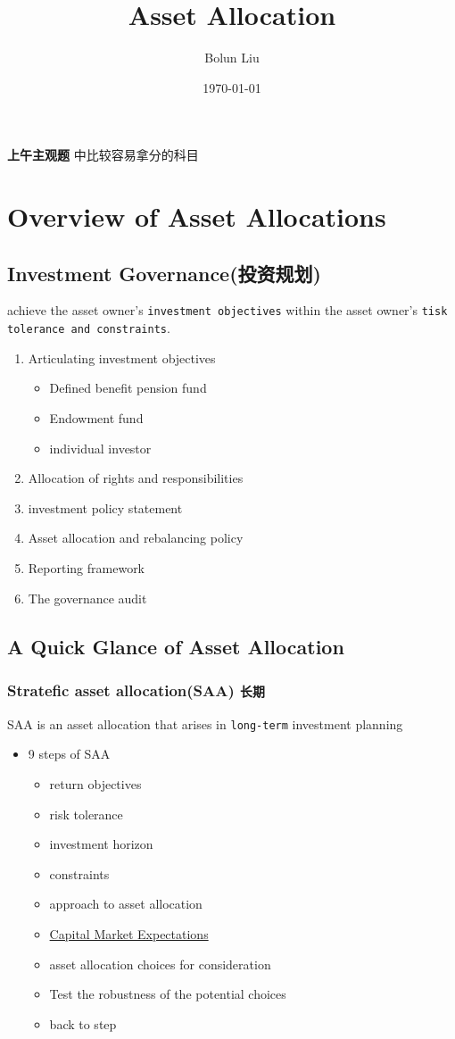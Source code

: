 \documentclass[12pt,a4paper]{article}
\author{Bolun Liu}
\date{\today}
\title{Asset Allocation}
\begin{document}
\maketitle
\tableofcontents

\textbf{上午主观题} 中比较容易拿分的科目
\section{Overview of Asset Allocations}
\label{sec:orgb323ae1}
\subsection{Investment Governance(投资规划)}
\label{sec:org6759c0b}
achieve the asset owner's \texttt{investment objectives} within the asset owner's \texttt{tisk tolerance and constraints}.
\begin{enumerate}
\item Articulating investment objectives
\begin{itemize}
\item Defined benefit pension fund
\item Endowment fund
\item individual investor
\end{itemize}
\item Allocation of rights and responsibilities
\item investment policy statement
\item Asset allocation and rebalancing policy
\item Reporting framework
\item The governance audit
\end{enumerate}
\subsection{A Quick Glance of Asset Allocation}
\label{sec:org4d40019}
\subsubsection{\textbf{Stratefic asset allocation(SAA)} \texttt{长期}}
\label{sec:orge11a20b}
SAA is an asset allocation that arises in \texttt{long-term} investment planning
\begin{itemize}
\item 9 steps of SAA
\begin{itemize}
\item return objectives
\item risk tolerance
\item investment horizon
\item constraints
\item approach to asset allocation
\item \href{20210416100520-capital_market_expectations.org}{Capital Market Expectations}
\item asset allocation choices for consideration
\item Test the robustness of the potential choices
\item back to step
\end{itemize}
\end{itemize}
\end{document}
